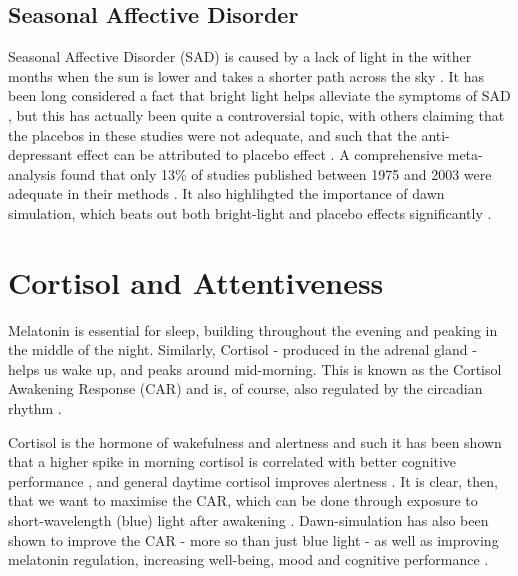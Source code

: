 \subsection{Seasonal Affective Disorder}

Seasonal Affective Disorder (SAD) is caused by a lack of light in the wither months when the sun is lower and takes a shorter path across the sky \citep{eastmanNaturalSummerWinter1990}. It has been long considered a fact that bright light helps alleviate the symptoms of SAD \citep{magnussonTreatmentSeasonalAffective1991, leeSpectralPropertiesPhototherapy1997,eastmanBrightLightTreatment1998}, but this has actually been quite a controversial topic, with others claiming that the placebos in these studies were not adequate, and such that the anti-depressant effect can be attributed to placebo effect \citep{eastman26ComparisonTwo1993}. A comprehensive meta-analysis found that only 13\% of studies published between 1975 and 2003 were adequate in their methods \citep{goldenEfficacyLightTherapy2005}. It also highlihgted the importance of dawn simulation, which beats out both bright-light and placebo effects significantly \citet{averyDawnSimulationBright2001}.


\section{Cortisol and Attentiveness}
\label{Sec:Cortisol}

Melatonin is essential for sleep, building throughout the evening and peaking in the middle of the night. Similarly, Cortisol - produced in the adrenal gland - helps us wake up, and peaks around mid-morning. This is known as the Cortisol Awakening Response (CAR) and is, of course, also regulated by the circadian rhythm \citep{friesCortisolAwakeningResponse2009}.

Cortisol is the hormone of wakefulness and alertness and such it has been shown that a higher spike in morning cortisol is correlated with better cognitive performance \citep{evansDiurnalCortisolCycle2011}, and general daytime cortisol improves alertness \citep{chapototCortisolSecretionRelated1998}. It is clear, then, that we want to maximise the CAR, which can be done through exposure to short-wavelength (blue) light after awakening \citep{figueiroShortWavelengthLightEnhances2012}. Dawn-simulation has also been shown to improve the CAR - more so than just blue light - as well as improving melatonin regulation, increasing well-being, mood and cognitive performance \citep{gabelEffectsArtificialDawn2013}.

